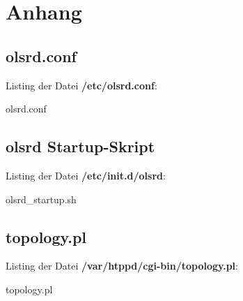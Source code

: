 
\section{Anhang}

\subsection{olsrd.conf}
\label{olsrd.conf}

Listing der Datei \textbf{/etc/olsrd.conf}:

{olsrd.conf}

\subsection{olsrd Startup-Skript}
\label{olsrd_startup.sh}

Listing der Datei \textbf{/etc/init.d/olsrd}:

{olsrd_startup.sh}

\subsection{topology.pl}
\label{topology.pl}

Listing der Datei \textbf{/var/htppd/cgi-bin/topology.pl}:

{topology.pl}

\renewcommand{\refname}{Literaturverzeichnis}
\clearpage
{}



